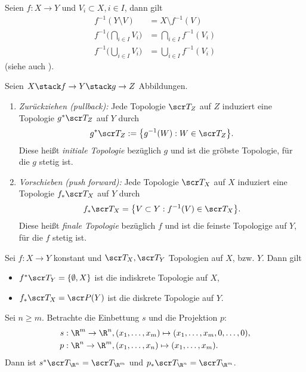 Seien $f: X \to Y$ und $V_i \subset X, i \in I$, dann gilt
\begin{align*}
	f^{-1}(Y \setminus V) &= X \setminus f^{-1}(V) \\
	f^{-1}\Big(\bigcap_{i\in I} V_i\Big) &= \bigcap_{i\in I} f^{-1}(V_i) \\
	f^{-1}\Big(\bigcup_{i\in I} V_i\Big) &= \bigcup_{i\in I} f^{-1}(V_i)
\end{align*}
(siehe auch ).
\begin{df}
	Seien $X \stack f\to Y \stack g\to Z$ Abbildungen.
	\begin{enumerate}[(1)]
		\item
			\emph{Zurückziehen (pullback):}
			Jede Topologie $\scr T_Z$ auf $Z$ induziert eine Topologie $g^*\scr T_Z$ auf $Y$ durch
			\[
				g^* \scr T_Z
				:= \big\{ g^{-1}(W) : W \in \scr T_Z \big\}.
			\]
			Diese heißt \emph{initiale Topologie} bezüglich $g$ und ist die gröbste Topologie, für die $g$ stetig ist.
		\item
			\emph{Vorschieben (push forward):}
			Jede Topologie $\scr T_X$ auf $X$ induziert eine Topologie $f_* \scr T_X$ auf $Y$ durch
			\[
				f_* \scr T_X = \big\{ V \subset Y : f^{-1}(V) \in \scr T_X \big\}.
			\]
			Diese heißt \emph{finale Topologie} bezüglich $f$ und ist die feinste Topologige auf $Y$, für die $f$ stetig ist.
	\end{enumerate}
\end{df}

\begin{ex}
	Sei $f: X \to Y$ konstant und $\scr T_X, \scr T_Y$ Topologien auf $X$, bzw. $Y$.
	Dann gilt
	\begin{itemize}
		\item
			$f^* \scr T_Y = \{ \emptyset, X \}$ ist die indiskrete Topologie auf $X$,
		\item
			$f_* \scr T_X = \scr P(Y)$ ist die diskrete Topologie auf $Y$.
	\end{itemize}
\end{ex}

\begin{ex}
	Sei $n \ge m$.
	Betrachte die Einbettung $s$ und die Projektion $p$:
	\begin{align*}
		s&: \R^m \to \R^n, (x_1,\dotsc, x_m) \mapsto (x_1, \dotsc, x_m, 0, \dotsc, 0), \\
		p&: \R^n \to \R^m, (x_1,\dotsc, x_n) \mapsto (x_1, \dotsc, x_m).
	\end{align*}
	Dann ist $s^* \scr T_{\R^n} = \scr T_{\R^m}$ und $p_* \scr T_{\R^n} = \scr T_{\R^m}$.
\end{ex}

